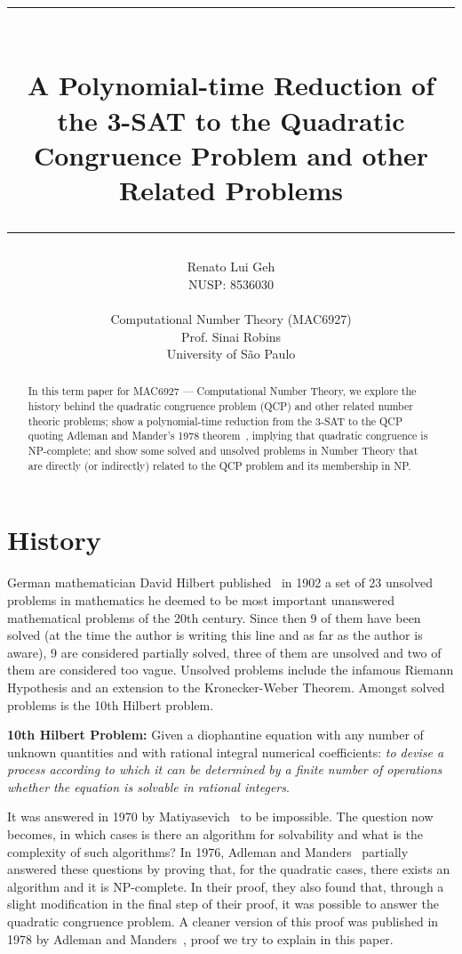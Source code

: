\documentclass{amsart}
\title{%
  \noindent\rule{13cm}{1.0pt}\\
  \vspace{0.2cm}
  A Polynomial-time Reduction of the 3-SAT to the Quadratic Congruence Problem and other Related Problems
  \noindent\rule{13cm}{0.8pt}
}
\author[]{\normalsize Renato Lui Geh\\\small NUSP\@: 8536030\\\\Computational Number Theory
(MAC6927)\\Prof\@. Sinai Robins\\University of São Paulo\\}
\theoremstyle{plain}
\numberwithin{equation}{section}
\begin{document}
\begin{abstract}
  In this term paper for MAC6927 --- Computational Number Theory, we explore the history behind the
  quadratic congruence problem (QCP) and other related number theoric problems; show a
  polynomial-time reduction from the 3-SAT to the QCP quoting Adleman and Mander's 1978
  theorem~\cite{qcp2}, implying that quadratic congruence is NP-complete; and show some solved and
  unsolved problems in Number Theory that are directly (or indirectly) related to the QCP problem
  and its membership in NP\@.
  \vspace*{-3.5em}
\end{abstract}

\maketitle

\section{History}

German mathematician David Hilbert published~\cite{hilbert} in 1902 a set of 23 unsolved problems
in mathematics he deemed to be most important unanswered mathematical problems of the 20th century.
Since then 9 of them have been solved (at the time the author is writing this line and as far as
the author is aware), 9 are considered partially solved, three of them are unsolved and two of them
are considered too vague. Unsolved problems include the infamous Riemann Hypothesis and an
extension to the Kronecker-Weber Theorem. Amongst solved problems is the 10th Hilbert problem.

\textbf{10th Hilbert Problem:} Given a diophantine equation with any number of unknown quantities
and with rational integral numerical coefficients: \textit{to devise a process according to which
it can be determined by a finite number of operations whether the equation is solvable in rational
integers}.

It was answered in 1970 by Matiyasevich~\cite{diophantine} to be impossible. The question now
becomes, in which cases is there an algorithm for solvability and what is the complexity of such
algorithms? In 1976, Adleman and Manders~\cite{qcp1} partially answered these questions by proving
that, for the quadratic cases, there exists an algorithm and it is NP-complete. In their proof,
they also found that, through a slight modification in the final step of their proof, it was
possible to answer the quadratic congruence problem. A cleaner version of this proof was published
in 1978 by Adleman and Manders~\cite{qcp2}, proof we try to explain in this paper.
\end{document}
